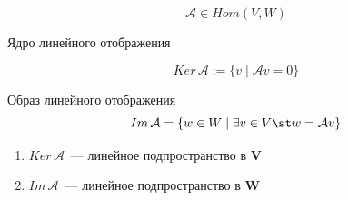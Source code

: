 \[ 
\mathcal{A} \in Hom(V, W)
\]

\begin{Definition}{Ядро линейного отображения}{}

\[
Ker \, \mathcal{A} := \{ v \; | \; \mathcal{A} v = 0\}
\]
\end{Definition}

\begin{Definition}{Образ линейного отображения}{}
\[
Im \, \mathcal{A} = \{ w \in W \; | \; \exists v \in V \st w = \mathcal{A} v \}
\]
\end{Definition}

\vspace{1.5\baselineskip}

\begin{Proposition}{}{}
    \begin{enumerate}
        \item $Ker \, \mathcal{A}$~--- линейное подпространство в $\mathbf{V}$
        \item $Im \, \mathcal{A}$~--- линейное подпространство в $\mathbf{W}$
    \end{enumerate}
\end{Proposition}

